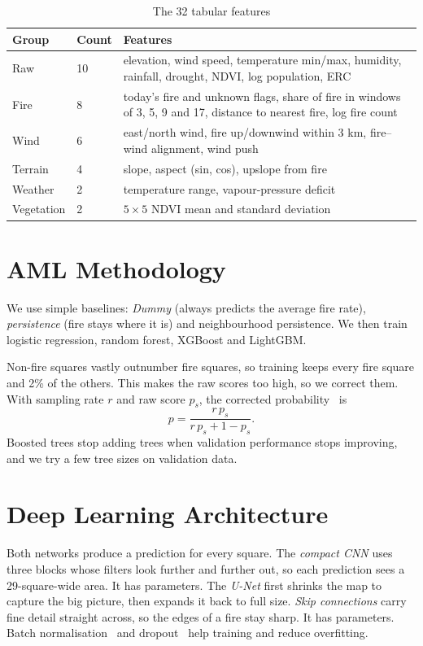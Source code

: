 \documentclass[conference]{IEEEtran}
\begin{document}
\begin{table}[t]
\centering
\caption{The 32 tabular features}
\label{tab:features}
\footnotesize
\begin{tabular}{p{}p{}p{}}
\toprule
Group & Count & Features \\
\midrule
Raw & 10 & elevation, wind speed, temperature min/max, humidity, rainfall, drought, NDVI, log population, ERC \\
Fire & 8 & today's fire and unknown flags, share of fire in windows of 3, 5, 9 and 17, distance to nearest fire, log fire count \\
Wind & 6 & east/north wind, fire up/downwind within 3 km, fire--wind alignment, wind push \\
Terrain & 4 & slope, aspect (sin, cos), upslope from fire \\
Weather & 2 & temperature range, vapour-pressure deficit \\
Vegetation & 2 & $5\times5$ NDVI mean and standard deviation \\
\bottomrule
\end{tabular}
\end{table}

\section{AML Methodology}
We use simple baselines: \emph{Dummy} (always predicts the average fire rate), \emph{persistence} (fire stays where it is) and neighbourhood persistence. We then train logistic regression, random forest, XGBoost and LightGBM.

Non-fire squares vastly outnumber fire squares, so training keeps every fire square and 2\% of the others. This makes the raw scores too high, so we correct them. With sampling rate $r$ and raw score $p_s$, the corrected probability~\cite{saerens2002prior} is
\begin{equation}
p = \frac{r\,p_s}{r\,p_s + 1 - p_s}.
\end{equation}
Boosted trees stop adding trees when validation performance stops improving, and we try a few tree sizes on validation data.

\section{Deep Learning Architecture}
Both networks produce a prediction for every square. The \emph{compact CNN} uses three blocks whose filters look further and further out, so each prediction sees a 29-square-wide area. It has \rCnnParameters{} parameters. The \emph{U-Net} first shrinks the map to capture the big picture, then expands it back to full size. \emph{Skip connections} carry fine detail straight across, so the edges of a fire stay sharp. It has \rUnetParameters{} parameters. Batch normalisation~\cite{ioffe2015batchnorm} and dropout~\cite{srivastava2014dropout} help training and reduce overfitting.
\end{document}
